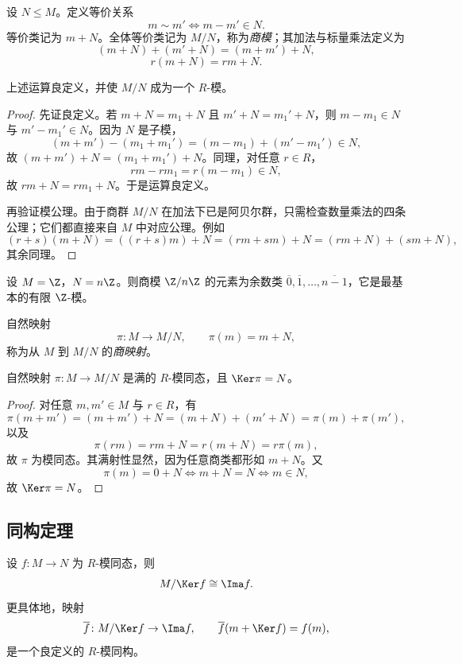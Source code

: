 \begin{definition}
设 $N\le M$。定义等价关系
\[
m\sim m'\iff m-m'\in N.
\]
等价类记为 $m+N$。全体等价类记为 $M/N$，称为\emph{商模}；其加法与标量乘法定义为
\[
(m+N)+(m'+N)=(m+m')+N,
\]
\[
r(m+N)=rm+N.
\]
\end{definition}

\begin{proposition}
上述运算良定义，并使 $M/N$ 成为一个 $R$-模。
\end{proposition}

\begin{proof}
先证良定义。若 $m+N=m_1+N$ 且 $m'+N=m_1'+N$，则 $m-m_1\in N$ 与 $m'-m_1'\in N$。因为 $N$ 是子模，
\[
(m+m')-(m_1+m_1')=(m-m_1)+(m'-m_1')\in N,
\]
故 $(m+m')+N=(m_1+m_1')+N$。同理，对任意 $r\in R$，
\[
rm-rm_1=r(m-m_1)\in N,
\]
故 $rm+N=rm_1+N$。于是运算良定义。

再验证模公理。由于商群 $M/N$ 在加法下已是阿贝尔群，只需检查数量乘法的四条公理；它们都直接来自 $M$ 中对应公理。例如
\[
(r+s)(m+N)=((r+s)m)+N=(rm+sm)+N=(rm+N)+(sm+N),
\]
其余同理。
\end{proof}

\begin{example}
设 $M=\Z$，$N=n\Z$。则商模 $\Z/n\Z$ 的元素为余数类 $\overline{0},\overline{1},\dots,\overline{n-1}$，它是最基本的有限 $\Z$-模。
\end{example}

\begin{definition}
自然映射
\[
\pi\colon M\to M/N,\qquad \pi(m)=m+N,
\]
称为从 $M$ 到 $M/N$ 的\emph{商映射}。
\end{definition}

\begin{proposition}
自然映射 $\pi\colon M\to M/N$ 是满的 $R$-模同态，且 $\Ker \pi=N$。
\end{proposition}

\begin{proof}
对任意 $m,m'\in M$ 与 $r\in R$，有
\[
\pi(m+m')=(m+m')+N=(m+N)+(m'+N)=\pi(m)+\pi(m'),
\]
以及
\[
\pi(rm)=rm+N=r(m+N)=r\pi(m),
\]
故 $\pi$ 为模同态。其满射性显然，因为任意商类都形如 $m+N$。又
\[
\pi(m)=0+N \iff m+N=N \iff m\in N,
\]
故 $\Ker \pi=N$。
\end{proof}

\subsection{同构定理}

\begin{theorem}[第一同构定理]
设 $f\colon M\to N$ 为 $R$-模同态，则
\[
M/\Ker f\cong \Ima f.
\]
更具体地，映射
\[
\overline f\colon M/\Ker f\to \Ima f,\qquad \overline f(m+\Ker f)=f(m),
\]
是一个良定义的 $R$-模同构。
\end{theorem}

